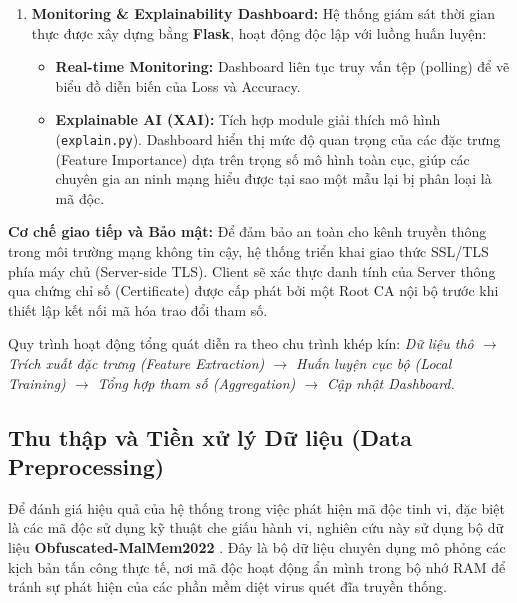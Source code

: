 \begin{enumerate}
    \item \textbf{Monitoring \& Explainability Dashboard:}
    Hệ thống giám sát thời gian thực được xây dựng bằng \textbf{Flask}, hoạt động độc lập với luồng huấn luyện:
    \begin{itemize}
        \item \textbf{Real-time Monitoring:} Dashboard liên tục truy vấn tệp  (polling) để vẽ biểu đồ diễn biến của Loss và Accuracy.
        \item \textbf{Explainable AI (XAI):} Tích hợp module giải thích mô hình (\texttt{explain.py}). Dashboard hiển thị mức độ quan trọng của các đặc trưng (Feature Importance) dựa trên trọng số mô hình toàn cục, giúp các chuyên gia an ninh mạng hiểu được tại sao một mẫu lại bị phân loại là mã độc.
    \end{itemize}
\end{enumerate}



\textbf{Cơ chế giao tiếp và Bảo mật:}
Để đảm bảo an toàn cho kênh truyền thông trong môi trường mạng không tin cậy, hệ thống triển khai giao thức SSL/TLS phía máy chủ (Server-side TLS). Client sẽ xác thực danh tính của Server thông qua chứng chỉ số (Certificate) được cấp phát bởi một Root CA nội bộ trước khi thiết lập kết nối mã hóa trao đổi tham số.



Quy trình hoạt động tổng quát diễn ra theo chu trình khép kín:
\textit{Dữ liệu thô $\rightarrow$ Trích xuất đặc trưng (Feature Extraction) $\rightarrow$ Huấn luyện cục bộ (Local Training) $\rightarrow$ Tổng hợp tham số (Aggregation) $\rightarrow$ Cập nhật Dashboard.}

\subsection{Thu thập và Tiền xử lý Dữ liệu (Data Preprocessing)}

Để đánh giá hiệu quả của hệ thống trong việc phát hiện mã độc tinh vi, đặc biệt là các mã độc sử dụng kỹ thuật che giấu hành vi, nghiên cứu này sử dụng bộ dữ liệu \textbf{Obfuscated-MalMem2022} \cite{Carrier2022DetectingOM}. Đây là bộ dữ liệu chuyên dụng mô phỏng các kịch bản tấn công thực tế, nơi mã độc hoạt động ẩn mình trong bộ nhớ RAM để tránh sự phát hiện của các phần mềm diệt virus quét đĩa truyền thống.

